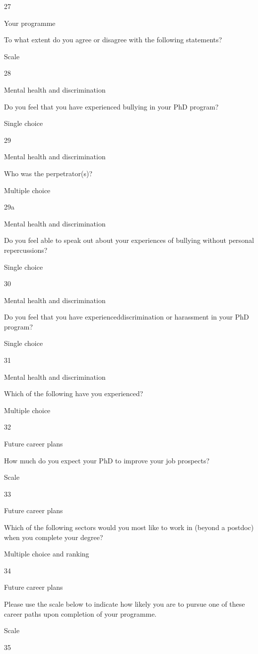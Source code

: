 \documentclass[
]{article}
\begin{document}
27

Your programme

To what extent do you agree or disagree with the following statements?

Scale

28

Mental health and discrimination

Do you feel that you have experienced bullying in your PhD program?

Single choice

29

Mental health and discrimination

Who was the perpetrator(s)?

Multiple choice

29a

Mental health and discrimination

Do you feel able to speak out about your experiences of bullying without
personal repercussions?

Single choice

30

Mental health and discrimination

Do you feel that you have experienceddiscrimination or harassment in
your PhD program?

Single choice

31

Mental health and discrimination

Which of the following have you experienced?

Multiple choice

32

Future career plans

How much do you expect your PhD to improve your job prospects?

Scale

33

Future career plans

Which of the following sectors would you most like to work in (beyond a
postdoc) when you complete your degree?

Multiple choice and ranking

34

Future career plans

Please use the scale below to indicate how likely you are to pursue one
of these career paths upon completion of your programme.

Scale

35
\end{document}
